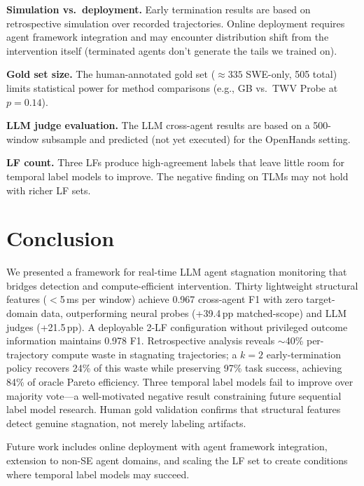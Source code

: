\documentclass[11pt,a4paper]{article}
\begin{document}
\textbf{Simulation vs.\ deployment.}
Early termination results are based on retrospective simulation over recorded trajectories.
Online deployment requires agent framework integration and may encounter distribution shift from the intervention itself (terminated agents don't generate the tails we trained on).

\textbf{Gold set size.}
The human-annotated gold set (${\approx}335$ SWE-only, 505 total) limits statistical power for method comparisons (e.g., GB vs.\ TWV Probe at $p{=}0.14$).

\textbf{LLM judge evaluation.}
The LLM cross-agent results are based on a 500-window subsample and predicted (not yet executed) for the OpenHands setting.

\textbf{LF count.}
Three LFs produce high-agreement labels that leave little room for temporal label models to improve.
The negative finding on TLMs may not hold with richer LF sets.

\section{Conclusion}

We presented a framework for real-time LLM agent stagnation monitoring that bridges detection and compute-efficient intervention.
Thirty lightweight structural features ($<$5\,ms per window) achieve 0.967 cross-agent F1 with zero target-domain data, outperforming neural probes (+39.4\,pp matched-scope) and LLM judges (+21.5\,pp).
A deployable 2-LF configuration without privileged outcome information maintains 0.978 F1.
Retrospective analysis reveals $\sim$40\% per-trajectory compute waste in stagnating trajectories;
a $k{=}2$ early-termination policy recovers 24\% of this waste while preserving 97\% task success, achieving 84\% of oracle Pareto efficiency.
Three temporal label models fail to improve over majority vote---a well-motivated negative result constraining future sequential label model research.
Human gold validation confirms that structural features detect genuine stagnation, not merely labeling artifacts.

Future work includes online deployment with agent framework integration, extension to non-SE agent domains, and scaling the LF set to create conditions where temporal label models may succeed.
\end{document}
